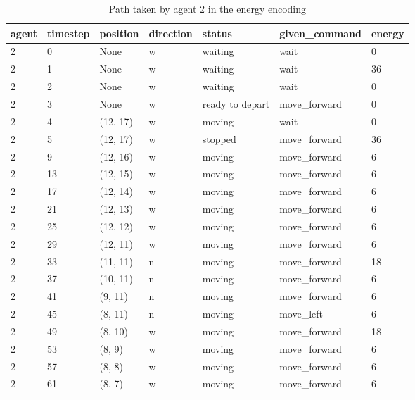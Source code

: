 \begin{table}[H]
  \centering
  \caption{Path taken by agent 2 in the energy encoding}
  \label{tab:energy2}
  \begin{tabular}{lllllll}
    \toprule
    agent & timestep & position & direction & status & given\_command & energy \\
    \midrule
2 & 0 & None & w & waiting & wait & 0 \\
2 & 1 & None & w & waiting & wait & 36 \\
2 & 2 & None & w & waiting & wait & 0 \\
2 & 3 & None & w & ready to depart & move\_forward & 0 \\
2 & 4 & (12, 17) & w & moving & wait & 0 \\
2 & 5 & (12, 17) & w & stopped & move\_forward & 36 \\
2 & 9 & (12, 16) & w & moving & move\_forward & 6 \\
2 & 13 & (12, 15) & w & moving & move\_forward & 6 \\
2 & 17 & (12, 14) & w & moving & move\_forward & 6 \\
2 & 21 & (12, 13) & w & moving & move\_forward & 6 \\
2 & 25 & (12, 12) & w & moving & move\_forward & 6 \\
2 & 29 & (12, 11) & w & moving & move\_forward & 6 \\
2 & 33 & (11, 11) & n & moving & move\_forward & 18 \\
2 & 37 & (10, 11) & n & moving & move\_forward & 6 \\
2 & 41 & (9, 11) & n & moving & move\_forward & 6 \\
2 & 45 & (8, 11) & n & moving & move\_left & 6 \\
2 & 49 & (8, 10) & w & moving & move\_forward & 18 \\
2 & 53 & (8, 9) & w & moving & move\_forward & 6 \\
2 & 57 & (8, 8) & w & moving & move\_forward & 6 \\
2 & 61 & (8, 7) & w & moving & move\_forward & 6 \\
    \bottomrule
  \end{tabular}
\end{table}

